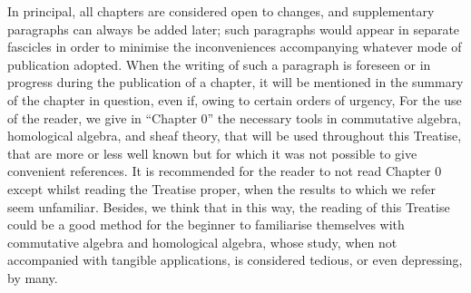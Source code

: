 \documentclass{book}
\begin{document}
\bigskip

In principal, all chapters are considered open to changes, and supplementary
paragraphs can always be added later; such paragraphs would appear in separate
fascicles in order to minimise the inconveniences accompanying whatever mode of
publication adopted. When the writing of such a paragraph is foreseen or in
progress during the publication of a chapter, it will be mentioned in the
summary of the chapter in question, even if, owing to certain orders of urgency,
 For the use of
the reader, we give in ``Chapter 0'' the necessary tools in commutative algebra,
homological algebra, and sheaf theory, that will be used throughout this
Treatise, that are more or less well known but for which it was not possible to
give convenient references. It is recommended for the reader to not read
Chapter 0 except whilst reading the Treatise proper, when the results to which
we refer seem unfamiliar. Besides, we think that in this way, the
reading of this Treatise could be a good method for the beginner to familiarise
themselves with commutative algebra and homological algebra, whose study, when
not accompanied with tangible applications, is considered tedious, or even
depressing, by many.

\asttri
\end{document}
